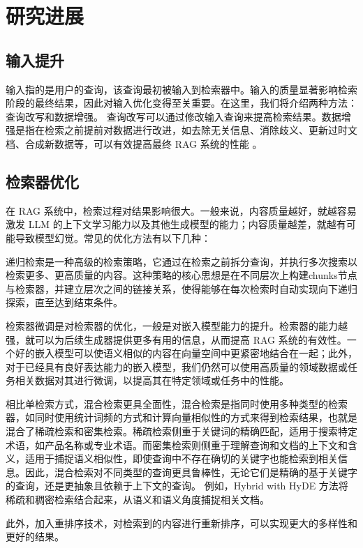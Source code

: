 \chapter{研究进展}

\section{输入提升}
输入指的是用户的查询，该查询最初被输入到检索器中。输入的质量显著影响检索阶段的最终结果，因此对输入优化变得至关重要。在这里，我们将介绍两种方法：查询改写和数据增强。
查询改写可以通过修改输入查询来提高检索结果。数据增强是指在检索之前提前对数据进行改进，如去除无关信息、消除歧义、更新过时文档、合成新数据等，可以有效提高最终 RAG 系统的性能
\cite{zhao2024retrievalaugmentedgenerationaigeneratedcontent}。
\section{检索器优化}
在 RAG 系统中，检索过程对结果影响很大。一般来说，内容质量越好，就越容易激发 LLM 的上下文学习能力以及其他生成模型的能力；内容质量越差，就越有可能导致模型幻觉。常见的优化方法有以下几种：

递归检索是一种高级的检索策略，它通过在检索之前拆分查询，并执行多次搜索以检索更多、更高质量的内容。这种策略的核心思想是在不同层次上构建chunks节点与检索器，并建立层次之间的链接关系，使得能够在每次检索时自动实现向下递归探索，直至达到结束条件。

检索器微调是对检索器的优化，一般是对嵌入模型能力的提升。检索器的能力越强，就可以为后续生成器提供更多有用的信息，从而提高 RAG 系统的有效性。一个好的嵌入模型可以使语义相似的内容在向量空间中更紧密地结合在一起；此外，对于已经具有良好表达能力的嵌入模型，我们仍然可以使用高质量的领域数据或任务相关数据对其进行微调，以提高其在特定领域或任务中的性能。

相比单检索方式，混合检索更具全面性，混合检索是指同时使用多种类型的检索器，如同时使用统计词频的方式和计算向量相似性的方式来得到检索结果，也就是混合了稀疏检索和密集检索。稀疏检索侧重于关键词的精确匹配，适用于搜索特定术语，如产品名称或专业术语。而密集检索则侧重于理解查询和文档的上下文和含义，适用于捕捉语义相似性，即使查询中不存在确切的关键字也能检索到相关信息。因此，混合检索对不同类型的查询更具鲁棒性，无论它们是精确的基于关键字的查询，还是更抽象且依赖于上下文的查询。
例如，Hybrid with HyDE \cite{wang2024searchingbestpracticesretrievalaugmented} 方法将稀疏和稠密检索结合起来，从语义和语义角度捕捉相关文档。

此外，加入重排序技术，对检索到的内容进行重新排序，可以实现更大的多样性和更好的结果。

